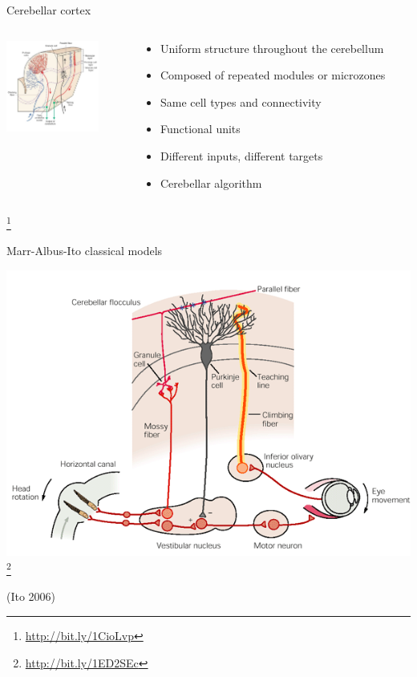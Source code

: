 \documentclass[ignorenonframetext,]{beamer}
\begin{document}
\begin{frame}{Cerebellar cortex}

\begin{columns}[T]
\begin{column}[T]{5cm}
\includegraphics[height=3cm]{images/tmp15F112.jpg}
\end{column}
\begin{column}[T]{5cm} %
\begin{itemize}
\item Uniform structure throughout the cerebellum
\item Composed of repeated modules or microzones
\item Same cell types and connectivity
\item Functional units
\item Different inputs, different targets
\item Cerebellar algorithm
\end{itemize}
\end{column}
\end{columns}

\footnote{\url{http://bit.ly/1CioLvp}}

\end{frame}

\begin{frame}{Marr-Albus-Ito classical models}

\includegraphics{images/ito.png}\footnote{\url{http://bit.ly/1ED2SEc}}

(Ito 2006)

\end{frame}
\end{document}
